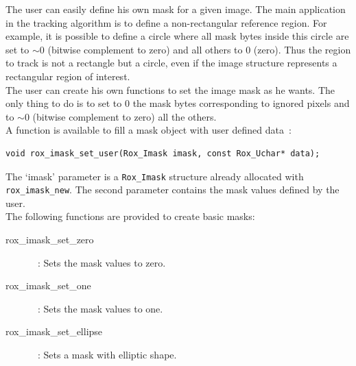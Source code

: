 The user can easily define his own mask for a given image. The main
application in the tracking algorithm is to define a non-rectangular
reference region. For example, it is possible to define a circle where
all mask bytes inside this circle are set to  $\sim$0 (bitwise complement to zero) and all
others to 0 (zero). Thus the region to track is not a rectangle but a
circle, even if the image structure represents a rectangular region of
interest.\\

The user can create his own functions to set the image mask as he
wants. The only thing to do is to set to 0 the mask bytes
corresponding to ignored pixels and to  $\sim$0 (bitwise complement to zero) all the others.\\

A function is available to fill a mask object with user defined data~:

\begin{lstlisting}
void rox_imask_set_user(Rox_Imask imask, const Rox_Uchar* data);
\end{lstlisting}

\noindent The `imask' parameter is a \lstinline$Rox_Imask$ structure already allocated with \lstinline$rox_imask_new$. 
The second parameter contains the mask values defined by the user. \\

\noindent The following functions are provided to create basic masks:
\begin{description}
  \item[rox\_imask\_set\_zero]~: Sets the mask values to zero.
  \item[rox\_imask\_set\_one]~: Sets the mask values to one.
  \item[rox\_imask\_set\_ellipse]~: Sets a mask with elliptic shape.
\end{description}

